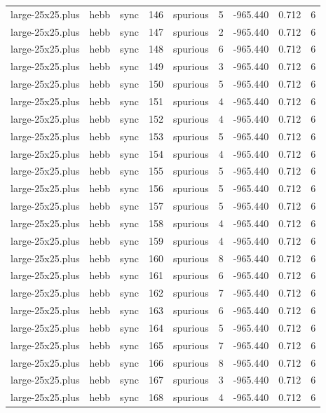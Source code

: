 \begin{tabular}{lllrlrrrr}
large-25x25.plus & hebb & sync & 146 & spurious & 5 & -965.440 & 0.712 & 6 \\
large-25x25.plus & hebb & sync & 147 & spurious & 2 & -965.440 & 0.712 & 6 \\
large-25x25.plus & hebb & sync & 148 & spurious & 6 & -965.440 & 0.712 & 6 \\
large-25x25.plus & hebb & sync & 149 & spurious & 3 & -965.440 & 0.712 & 6 \\
large-25x25.plus & hebb & sync & 150 & spurious & 5 & -965.440 & 0.712 & 6 \\
large-25x25.plus & hebb & sync & 151 & spurious & 4 & -965.440 & 0.712 & 6 \\
large-25x25.plus & hebb & sync & 152 & spurious & 4 & -965.440 & 0.712 & 6 \\
large-25x25.plus & hebb & sync & 153 & spurious & 5 & -965.440 & 0.712 & 6 \\
large-25x25.plus & hebb & sync & 154 & spurious & 4 & -965.440 & 0.712 & 6 \\
large-25x25.plus & hebb & sync & 155 & spurious & 5 & -965.440 & 0.712 & 6 \\
large-25x25.plus & hebb & sync & 156 & spurious & 5 & -965.440 & 0.712 & 6 \\
large-25x25.plus & hebb & sync & 157 & spurious & 5 & -965.440 & 0.712 & 6 \\
large-25x25.plus & hebb & sync & 158 & spurious & 4 & -965.440 & 0.712 & 6 \\
large-25x25.plus & hebb & sync & 159 & spurious & 4 & -965.440 & 0.712 & 6 \\
large-25x25.plus & hebb & sync & 160 & spurious & 8 & -965.440 & 0.712 & 6 \\
large-25x25.plus & hebb & sync & 161 & spurious & 6 & -965.440 & 0.712 & 6 \\
large-25x25.plus & hebb & sync & 162 & spurious & 7 & -965.440 & 0.712 & 6 \\
large-25x25.plus & hebb & sync & 163 & spurious & 6 & -965.440 & 0.712 & 6 \\
large-25x25.plus & hebb & sync & 164 & spurious & 5 & -965.440 & 0.712 & 6 \\
large-25x25.plus & hebb & sync & 165 & spurious & 7 & -965.440 & 0.712 & 6 \\
large-25x25.plus & hebb & sync & 166 & spurious & 8 & -965.440 & 0.712 & 6 \\
large-25x25.plus & hebb & sync & 167 & spurious & 3 & -965.440 & 0.712 & 6 \\
large-25x25.plus & hebb & sync & 168 & spurious & 4 & -965.440 & 0.712 & 6 \\

\end{tabular}
